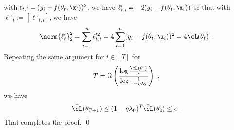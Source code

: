 %
with $\ell_{t,i} = (y_i - f(\theta_t;\x_i))^2$, we have $\ell'_{t,i} = -2(y_i-f(\theta_t;\x_i))$ so that with $\ell'_t := [\ell'_{t,i}]$, we have 
\begin{equation}
\norm{\ell'_t}^2_2 =\sum_{i=1}^n \ell'^2_{t,i} = 4\sum_{i=1}^n (y_i - f(\theta_t;\x_i))^2 = 4 \bar{\cL}(\theta_t)~.
\label{eq:sqlossgrad}
\end{equation}
Repeating the same argument for $t \in [T]$ for 
\begin{align}
T = \Omega\left( \frac{\log \frac{\bar{\cL(\theta_0)}}{\epsilon}}{\log \frac{1}{1-\eta \lambda_0}} \right) ~,
\end{align}
we have 
\begin{align*}
\bar{\cL}(\theta_{T+1}) \leq (1-\eta \lambda_0)^T \bar{\cL}(\theta_0) \leq \epsilon~.
\end{align*}
That  completes the proof. \qed 





